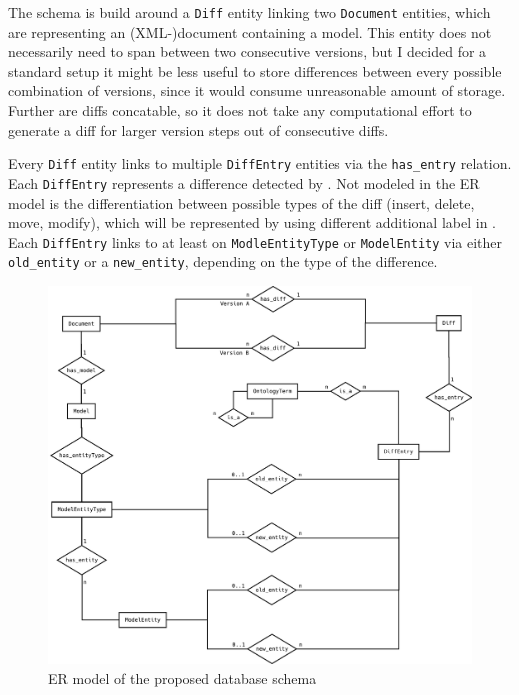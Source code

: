 The schema is build around a \texttt{Diff} entity linking two \texttt{Document} entities, which are representing an (XML-)document containing a model. This entity does not necessarily need to span between two consecutive versions, but I decided for a standard setup it might be less useful to store differences between every possible combination of versions, since it would consume unreasonable amount of storage. Further are diffs concatable, so it does not take any computational effort to generate a diff for larger version steps out of consecutive diffs.

Every \texttt{Diff} entity links to multiple \texttt{DiffEntry} entities via the \texttt{has\_entry} relation. Each \texttt{DiffEntry} represents a difference detected by \bives \cite{Scharm2015}. Not modeled in the ER model is the differentiation between possible types of the diff (insert, delete, move, modify), which will be represented by using different additional label in \neoj.
Each \texttt{DiffEntry} links to at least on \texttt{ModleEntityType} or \texttt{ModelEntity} via either \texttt{old\_entity} or a \texttt{new\_entity}, depending on the type of the difference.



\begin{figure}
	\centering
	\includegraphics[width=\textwidth]{resources/db-concept-er.pdf}
	\caption{ER model of the proposed database schema}
	\label{fig:db-er-model}
\end{figure}

